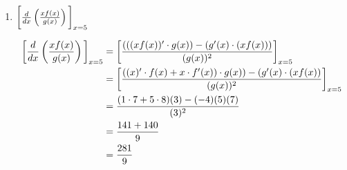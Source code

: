 \documentclass[nooutcomes,handout]{ximera}
\begin{document}
\begin{problem}
\begin{enumerate}
	\item $\bigg[  \frac{d}{dx} \left( \frac{xf(x)}{g(x)} \right) \bigg]_{x=5}$
		\begin{freeResponse}
		\begin{align*}
		\bigg[ \frac{d}{dx} \left( \frac{xf(x)}{g(x)} \right) \bigg]_{x=5} &= \bigg[ \frac{(((xf(x))' \cdot g(x)) - (g'(x) \cdot (xf(x)))}{(g(x))^2} \bigg]_{x=5}  \\
		&= \bigg[ \frac{\left( (x)' \cdot f(x)+x \cdot f'(x) \right) \cdot g(x)) - (g'(x) \cdot (xf(x))}{(g(x))^2} \bigg]_{x=5}  \\
		&= \frac{(1 \cdot 7+ 5 \cdot 8)(3) - (-4)(5)(7)}{(3)^2}  \\
		&= \frac{141+140}{9}  \\
		&= \frac{281}{9}
		\end{align*}
		\end{freeResponse}

	\end{enumerate}
		
\end{problem}
\end{document}
